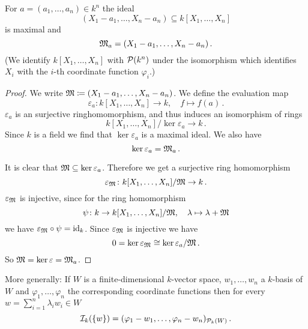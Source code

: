 \begin{lemma}
  For $a = (a_1, \dotsc, a_n) \in k^n$ the ideal
  \[
              (X_1 - a_1, \dotsc, X_n - a_n)
    \subseteq k[X_1, \dotsc, X_n]
  \]
  is maximal and
  \[
    \mathfrak{M}_a = (X_1 - a_1, \dotsc, X_n - a_n) \,.
  \]
  (We identify $k[X_1, \dotsc, X_n]$ with $\mathcal{P}(k^n)$ under the isomorphism which identifies $X_i$ with the $i$-th coordinate function $\varphi_i$.)
\end{lemma}
\begin{proof}
  We write $\mathfrak{M} \coloneqq (X_1 - a_1, \dotsc, X_n - a_n)$. We define the evaluation map
  \[
            \varepsilon_a
    \colon  k[X_1, \dotsc, X_n]
    \to     k,
    \quad   f
    \mapsto f(a) \,.
  \]
  $\varepsilon_a$ is an surjective ringhomomorphism, and thus induces an isomorphism of rings
  \[
        k[X_1, \dotsc, X_n] / \ker \varepsilon_a
    \to k \,.
  \]
  Since $k$ is a field we find that $\ker \varepsilon_a$ is a maximal ideal. We also have
  \[
      \ker \varepsilon_a
    = \mathfrak{M}_a \,.
  \]
  
  It is clear that $\mathfrak{M} \subseteq \ker \varepsilon_a$. Therefore we get a surjective ring homomorphism
  \[
            \varepsilon_\mathfrak{M}
    \colon  k[X_1, \dotsc, X_n] / \mathfrak{M}
    \to     k \,.
  \]
  $\varepsilon_\mathfrak{M}$ is injective, since for the ring homomorphism
  \[
            \psi
    \colon  k
    \to     k[X_1, \dotsc, X_n] / \mathfrak{M},
    \quad   \lambda
    \mapsto \lambda + \mathfrak{M}
  \]
  we have $\varepsilon_\mathfrak{M} \circ \psi = \operatorname{id}_k$. Since $\varepsilon_\mathfrak{M}$ is injective we have
  \[
          0
    =     \ker \varepsilon_\mathfrak{M}
    \cong \ker \varepsilon_a / \mathfrak{M} \,.
  \]
  So $\mathfrak{M} = \ker \varepsilon = \mathfrak{M}_a$.
\end{proof}

More generally:
If $W$ is a finite-dimensional $k$-vector space, $w_1, \dotsc, w_n$ a $k$-basis of $W$ and $\varphi_1, \dotsc, \varphi_n$ the corresponding coordinate functions then for every $w = \sum_{i=1}^n \lambda_i w_i \in W$
\[
    \mathcal{I}_k(\{w\})
  = ( \varphi_1 - w_1, \dotsc, \varphi_n - w_n )_{\mathcal{P}_k(W)} \,.
\]


